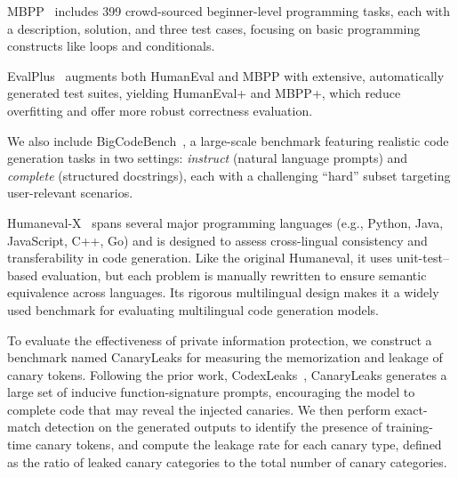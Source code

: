 \documentclass{article}
\theoremstyle{plain}
\theoremstyle{definition}
\theoremstyle{remark}
\begin{document}
{ MBPP~\cite{austin2021programsynthesislargelanguage} includes 399 crowd-sourced beginner-level programming tasks, each with a description, solution, and three test cases, focusing on basic programming constructs like loops and conditionals.

 EvalPlus~\cite{liu2023your} augments both HumanEval and MBPP with extensive, automatically generated test suites, yielding HumanEval+ and MBPP+, which reduce overfitting and offer more robust correctness evaluation. 

 We also include BigCodeBench~\cite{zhuo2024bigcodebenchbenchmarkingcodegeneration}, a large-scale benchmark featuring realistic code generation tasks in two settings: \textit{instruct} (natural language prompts) and \textit{complete} (structured docstrings), each with a challenging “hard” subset targeting user-relevant scenarios.

 Humaneval-X~\cite{zheng2023codegeex} spans several major programming languages (e.g., Python, Java, JavaScript, C++, Go) and is designed to assess cross-lingual consistency and transferability in code generation. Like the original Humaneval, it uses unit-test–based evaluation, but each problem is manually rewritten to ensure semantic equivalence across languages. Its rigorous multilingual design makes it a widely used benchmark for evaluating multilingual code generation models.

 To evaluate the effectiveness of private information protection, we construct a benchmark named CanaryLeaks for measuring the memorization and leakage of canary tokens. Following the prior work, CodexLeaks~\cite{codexleaks}, CanaryLeaks generates a large set of inducive function-signature prompts, encouraging the model to complete code that may reveal the injected canaries. We then perform exact-match detection on the generated outputs to identify the presence of training-time canary tokens, and compute the leakage rate for each canary type, defined as the ratio of leaked canary categories to the total number of canary categories.





}
\end{document}
